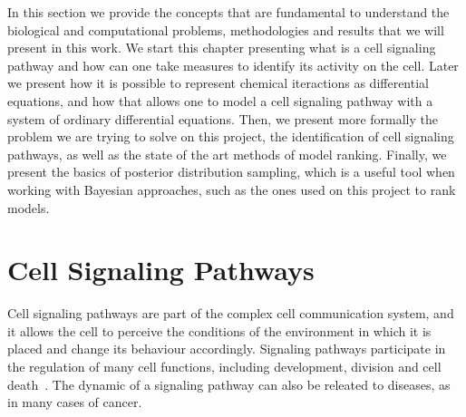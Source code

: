 
In this section we provide the concepts that are fundamental to 
understand the biological and computational problems, methodologies and
results that we will present in this work. We start this chapter 
presenting what is a cell signaling pathway and how can one take 
measures to identify its activity on the cell. Later we present how 
it is possible to represent chemical iteractions as differential 
equations, and how that allows one to model a cell signaling pathway
with a system of ordinary differential equations. Then, we present 
more formally the problem we are trying to solve on this project, the
identification of cell signaling pathways, as well as the state of the
art methods of model ranking. Finally, we present the basics of 
posterior distribution sampling, which is a useful tool when working 
with Bayesian approaches, such as the ones used on this project to rank 
models.

\section{Cell Signaling Pathways}
Cell signaling pathways are part of the complex cell communication 
system, and it allows the cell to perceive the conditions of the 
environment in which it is placed and change its behaviour accordingly.
Signaling pathways participate in the regulation of many cell functions,
including development, division and cell death~\cite{Hancock2017}. The
dynamic of a signaling pathway can also be releated to diseases, as in
many cases of cancer.

